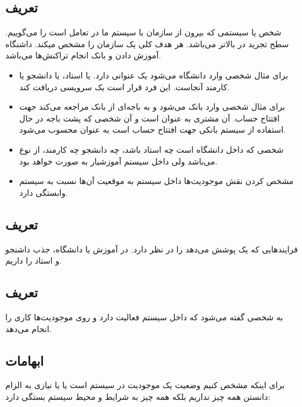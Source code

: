 \subsection{تعریف }

شخص یا سیستمی که بیرون از سازمان با سیستم ما در تعامل است را می‌گوییم. سطح تجرید
در  بالاتر می‌باشد. هر  هدف کلی یک سازمان را مشخص
‌میکند.  داشنگاه آموزش دادن و  بانک انجام تراکنش‌ها می‌باشد.

\begin{itemize}
    \item برای مثال شخصی وارد دانشگاه می‌شود یک عنوانی دارد. یا استاد، یا دانشجو
    یا کارمند آنجاست. این فرد قرار است یک سرویسی دریافت کند.
    \item برای مثال شخصی وارد بانک می‌شود و به باجه‌ای از بانک مراجعه می‌کند جهت
    افتتاح حساب. آن مشتری به عنوان  است و آن شخصی که پشت باجه
    در حال استفاده از سیستم بانکی جهت افتتاح حساب است به عنوان  محسوب
    می‌شود.
    \item شخصی که داخل دانشگاه است چه استاد باشد، چه دانشجو چه کارمند، از نوع
     می‌باشد ولی داخل سیستم آموزشیار به صورت  خواهد
    بود.
    \item مشخص کردن نقش موجودیت‌ها داخل سیستم به موقعیت آن‌ها نسبت به سیستم
    وابستگی دارد.
\end{itemize}

\subsection{تعریف }

فرایند‌هایی که یک  پوشش می‌دهد را در نظر دارد. در 
آموزش یا دانشگاه،  جذب داشنجو و استاد را داریم.

\subsection{تعریف }

به شخصی گفته می‌شود که داخل سیستم فعالیت دارد و روی موجودیت‌ها کاری را انجام
می‌دهد.

\subsection{ابهامات}

برای اینکه مشخص کنیم وضعیت یک موجودیت در سیستم  است یا  یا  نیازی به الزام دانستن همه چیز نداریم بلکه همه چیز
به شرایط و محیط سیستم بستگی دارد:

